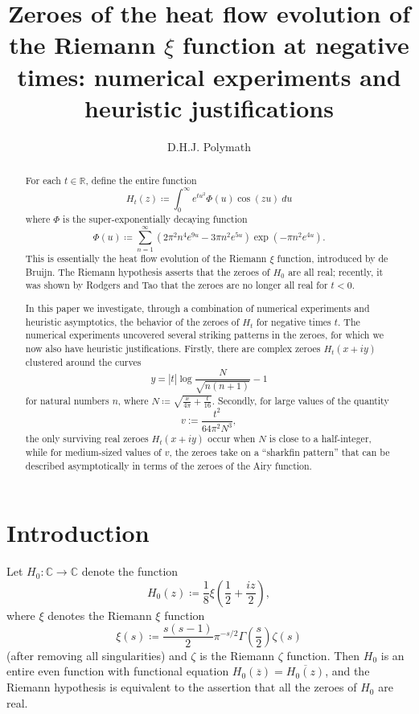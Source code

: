 \documentclass[a4paper,11pt,twoside]{amsart}
\newcommand\R{\mathbb{R}}
\newcommand\C{\mathbb{C}}
\begin{document}
\title[Zeroes of heat flow of Riemann $\xi$]{Zeroes of the heat flow evolution of the Riemann $\xi$ function at negative times: numerical experiments and heuristic justifications}

\author{D.H.J. Polymath}
\address{\tt{http://michaelnielsen.org/polymath1/index.php}}


\begin{abstract}
For each $t \in \R$, define the entire function
$$ H_t(z) \coloneqq \int_0^\infty e^{tu^2} \Phi(u) \cos(zu)\ du$$
where $\Phi$ is the super-exponentially decaying function
$$ \Phi(u) \coloneqq \sum_{n=1}^\infty (2\pi^2  n^4 e^{9u} - 3\pi n^2 e^{5u} ) \exp(-\pi n^2 e^{4u} ).$$
This is essentially the heat flow evolution of the Riemann $\xi$ function, introduced by de Bruijn.  The Riemann hypothesis asserts that the zeroes of $H_0$ are all real; recently, it was shown by Rodgers and Tao that the zeroes are no longer all real for $t<0$.

In this paper we investigate, through a combination of numerical experiments and heuristic asymptotics, the behavior of the zeroes of $H_t$ for negative times $t$.  The numerical experiments uncovered several striking patterns in the zeroes, for which we now also have heuristic justifications.  Firstly, there are complex zeroes $H_t(x+iy)$ clustered around the curves 
$$ y = |t| \log \frac{N}{\sqrt{n(n+1)}} - 1$$
for natural numbers $n$, where $N \coloneqq \sqrt{\frac{x}{4\pi} + \frac{t}{16}}$.  Secondly, for large values of the quantity 
$$ v := \frac{t^2}{64 \pi^2 N^3},$$
the only surviving real zeroes $H_t(x+iy)$ occur when $N$ is close to a half-integer, while for medium-sized values of $v$, the zeroes take on a ``sharkfin pattern'' that can be described asymptotically in terms of the zeroes of the Airy function.
\end{abstract}

\maketitle

\section{Introduction}

Let $H_0 \colon \C \to \C$ denote the function
\begin{equation}\label{hoz}
 H_0(z) \coloneqq \frac{1}{8} \xi\left(\frac{1}{2} + \frac{iz}{2}\right),
\end{equation}
where $\xi$ denotes the Riemann $\xi$ function
\begin{equation}\label{sas}
 \xi(s) \coloneqq \frac{s(s-1)}{2} \pi^{-s/2} \Gamma\left(\frac{s}{2}\right) \zeta(s)
\end{equation}
(after removing all singularities) and $\zeta$ is the Riemann $\zeta$ function.
Then $H_0$ is an entire even function with functional equation $H_0(\overline{z}) = \overline{H_0(z)}$, and the Riemann hypothesis is equivalent to the assertion that all the zeroes of $H_0$ are real.
\end{document}

